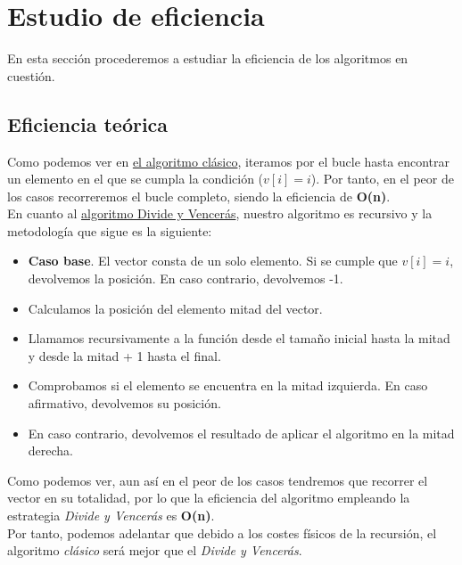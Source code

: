 \documentclass[12pt,spanish]{article}
\begin{document}
\newpage

\section{Estudio de eficiencia}

En esta sección procederemos a estudiar la eficiencia de los algoritmos en cuestión.

\subsection{Eficiencia teórica}

Como podemos ver en \textcolor{blue!60}{\hyperref[alg:clasico]{el algoritmo clásico}}, iteramos por el bucle hasta encontrar un elemento en el que se cumpla la condición ($v[i]=i$). Por tanto, en el peor de los casos recorreremos el bucle completo, siendo la eficiencia de \textbf{O(n)}.\\

En cuanto al \textcolor{blue!60}{\hyperref[alg:clasico]{algoritmo Divide y Vencerás}}, nuestro algoritmo es recursivo y la metodología que sigue es la siguiente:
\begin{itemize}
	\item \textbf{Caso base}. El vector consta de un solo elemento. Si se cumple que $v[i]=i$, devolvemos \textcolor{blue!90}{la posición}. En caso contrario, devolvemos \textcolor{blue!90}{-1}.
	\item Calculamos la posición del elemento mitad del vector.
	\item Llamamos recursivamente a la función desde el tamaño inicial hasta la mitad y desde la mitad + 1 hasta el final.
	\item Comprobamos si el elemento se encuentra en la mitad izquierda. En caso afirmativo, devolvemos \textcolor{blue!90}{su posición}.
	\item En caso contrario, devolvemos \textcolor{blue!90}{el resultado de aplicar el algoritmo en la mitad derecha}.
\end{itemize}

Como podemos ver, aun así en el peor de los casos tendremos que recorrer el vector en su totalidad, por lo que la eficiencia del algoritmo empleando la estrategia \textit{Divide y Vencerás} es \textbf{O(n)}.\\

Por tanto, podemos adelantar que debido a los costes físicos de la recursión, el algoritmo \emph{clásico} será mejor que el \emph{Divide y Vencerás}.
\end{document}
